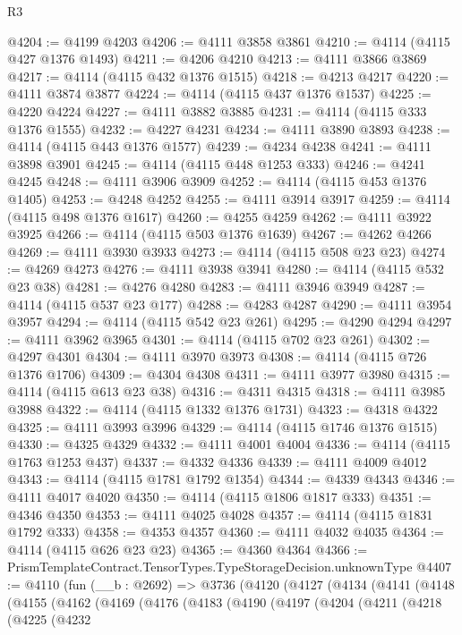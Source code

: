 \begin{lexlean}{R3}
\begin{coremodule}
@4204 := @4199 @4203
@4206 := @4111 @3858 @3861
@4210 := @4114 (@4115 @427 @1376 @1493)
@4211 := @4206 @4210
@4213 := @4111 @3866 @3869
@4217 := @4114 (@4115 @432 @1376 @1515)
@4218 := @4213 @4217
@4220 := @4111 @3874 @3877
@4224 := @4114 (@4115 @437 @1376 @1537)
@4225 := @4220 @4224
@4227 := @4111 @3882 @3885
@4231 := @4114 (@4115 @333 @1376 @1555)
@4232 := @4227 @4231
@4234 := @4111 @3890 @3893
@4238 := @4114 (@4115 @443 @1376 @1577)
@4239 := @4234 @4238
@4241 := @4111 @3898 @3901
@4245 := @4114 (@4115 @448 @1253 @333)
@4246 := @4241 @4245
@4248 := @4111 @3906 @3909
@4252 := @4114 (@4115 @453 @1376 @1405)
@4253 := @4248 @4252
@4255 := @4111 @3914 @3917
@4259 := @4114 (@4115 @498 @1376 @1617)
@4260 := @4255 @4259
@4262 := @4111 @3922 @3925
@4266 := @4114 (@4115 @503 @1376 @1639)
@4267 := @4262 @4266
@4269 := @4111 @3930 @3933
@4273 := @4114 (@4115 @508 @23 @23)
@4274 := @4269 @4273
@4276 := @4111 @3938 @3941
@4280 := @4114 (@4115 @532 @23 @38)
@4281 := @4276 @4280
@4283 := @4111 @3946 @3949
@4287 := @4114 (@4115 @537 @23 @177)
@4288 := @4283 @4287
@4290 := @4111 @3954 @3957
@4294 := @4114 (@4115 @542 @23 @261)
@4295 := @4290 @4294
@4297 := @4111 @3962 @3965
@4301 := @4114 (@4115 @702 @23 @261)
@4302 := @4297 @4301
@4304 := @4111 @3970 @3973
@4308 := @4114 (@4115 @726 @1376 @1706)
@4309 := @4304 @4308
@4311 := @4111 @3977 @3980
@4315 := @4114 (@4115 @613 @23 @38)
@4316 := @4311 @4315
@4318 := @4111 @3985 @3988
@4322 := @4114 (@4115 @1332 @1376 @1731)
@4323 := @4318 @4322
@4325 := @4111 @3993 @3996
@4329 := @4114 (@4115 @1746 @1376 @1515)
@4330 := @4325 @4329
@4332 := @4111 @4001 @4004
@4336 := @4114 (@4115 @1763 @1253 @437)
@4337 := @4332 @4336
@4339 := @4111 @4009 @4012
@4343 := @4114 (@4115 @1781 @1792 @1354)
@4344 := @4339 @4343
@4346 := @4111 @4017 @4020
@4350 := @4114 (@4115 @1806 @1817 @333)
@4351 := @4346 @4350
@4353 := @4111 @4025 @4028
@4357 := @4114 (@4115 @1831 @1792 @333)
@4358 := @4353 @4357
@4360 := @4111 @4032 @4035
@4364 := @4114 (@4115 @626 @23 @23)
@4365 := @4360 @4364
@4366 := PrismTemplateContract.TensorTypes.TypeStorageDecision.unknownType
@4407 := @4110
    (fun (__b : @2692) =>
    @3736
      (@4120
        (@4127
          (@4134
            (@4141
              (@4148
                (@4155
                  (@4162
                    (@4169
                      (@4176
                        (@4183
                          (@4190
                            (@4197
                              (@4204
                                (@4211
                                  (@4218
                                    (@4225
                                      (@4232

\end{coremodule}
\end{lexlean}
